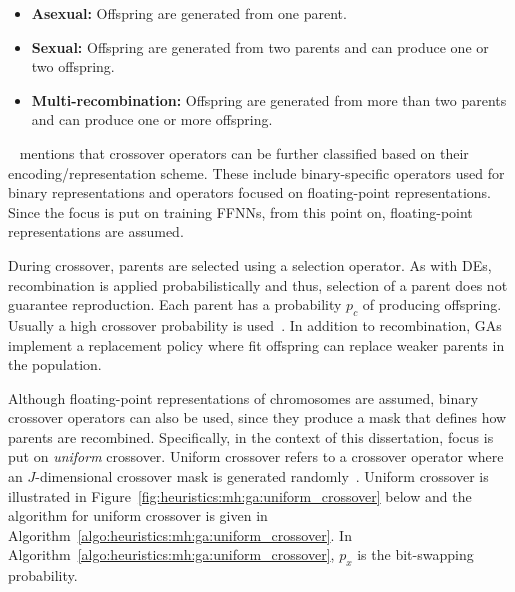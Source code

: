 \begin{itemize}
      \item \textbf{Asexual:} Offspring are generated from one parent.

      \item \textbf{Sexual:} Offspring are generated from two parents and can produce one or two offspring.

      \item \textbf{Multi-recombination:} Offspring are generated from more than two parents and can produce one or more offspring.
\end{itemize}

\citeauthor{ref:engelbrecht:2007}~\cite{ref:engelbrecht:2007} mentions that crossover operators can be further classified based on their encoding/representation scheme. These include binary-specific operators used for binary representations and operators focused on floating-point representations. Since the focus is put on training \acp{FFNN}, from this point on, floating-point representations are assumed.

During crossover, parents are selected using a selection operator. As with \acp{DE}, recombination is applied probabilistically and thus, selection of a parent does not guarantee reproduction. Each parent has a probability $p_{c}$ of producing offspring. Usually a high crossover probability is used~\cite{ref:engelbrecht:2007}. In addition to recombination, \acp{GA} implement a replacement policy where fit offspring can replace weaker parents in the population.

Although floating-point representations of chromosomes are assumed, binary crossover operators can also be used, since they produce a mask that defines how parents are recombined. Specifically, in the context of this dissertation, focus is put on \textit{uniform} crossover. Uniform crossover refers to a crossover operator where an $J$-dimensional crossover mask is generated randomly~\cite{ref:syswerda:1989}. Uniform crossover is illustrated in Figure~\ref{fig:heuristics:mh:ga:uniform_crossover} below and the algorithm for uniform crossover is given in Algorithm~\ref{algo:heuristics:mh:ga:uniform_crossover}. In Algorithm~\ref{algo:heuristics:mh:ga:uniform_crossover}, $p_{x}$ is the bit-swapping probability.


